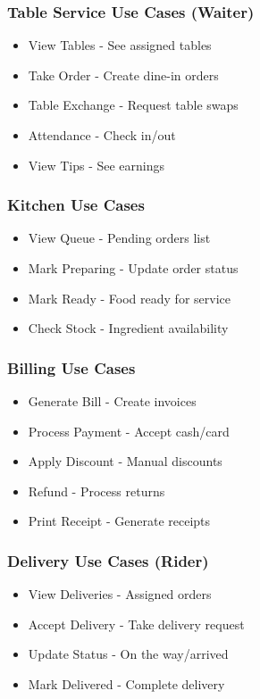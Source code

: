 \documentclass[12pt,a4paper]{article}
\begin{document}
\subsubsection{Table Service Use Cases (Waiter)}
\begin{itemize}
    \item View Tables - See assigned tables
    \item Take Order - Create dine-in orders
    \item Table Exchange - Request table swaps
    \item Attendance - Check in/out
    \item View Tips - See earnings
\end{itemize}

\subsubsection{Kitchen Use Cases}
\begin{itemize}
    \item View Queue - Pending orders list
    \item Mark Preparing - Update order status
    \item Mark Ready - Food ready for service
    \item Check Stock - Ingredient availability
\end{itemize}

\subsubsection{Billing Use Cases}
\begin{itemize}
    \item Generate Bill - Create invoices
    \item Process Payment - Accept cash/card
    \item Apply Discount - Manual discounts
    \item Refund - Process returns
    \item Print Receipt - Generate receipts
\end{itemize}

\subsubsection{Delivery Use Cases (Rider)}
\begin{itemize}
    \item View Deliveries - Assigned orders
    \item Accept Delivery - Take delivery request
    \item Update Status - On the way/arrived
    \item Mark Delivered - Complete delivery
\end{itemize}
\end{document}

